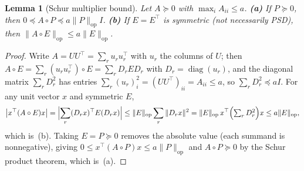 \documentclass{article}
\newtheorem{lemma}[theorem]{Lemma}
\begin{document}
\begin{lemma}[Schur multiplier bound]\label{lem:schur}
Let $A\succeq0$ with $\max_i A_{ii}\le a$. \textbf{(a)} If $P\succeq0$, then $0\preceq A\circ P\preceq a\|P\|_{\mathrm{op}}I$. \textbf{(b)} If $E=E^\top$ is symmetric (not necessarily PSD), then $\|A\circ E\|_{\mathrm{op}}\le a\|E\|_{\mathrm{op}}$.
\end{lemma}
\begin{proof}
Write $A=UU^\top=\sum_r u_r u_r^\top$ with $u_r$ the columns of $U$; then $A\circ E=\sum_r(u_r u_r^\top)\circ E=\sum_r D_r E D_r$ with $D_r=\operatorname{diag}(u_r)$, and the diagonal matrix $\sum_r D_r^2$ has entries $\sum_r(u_r)_i^2=(UU^\top)_{ii}=A_{ii}\le a$, so $\sum_r D_r^2\preceq aI$. For any unit vector $x$ and symmetric $E$,
\[
\bigl|x^\top(A\circ E)x\bigr|=\Bigl|\sum_r(D_r x)^\top E(D_r x)\Bigr|\le\|E\|_{\mathrm{op}}\sum_r\|D_r x\|^2=\|E\|_{\mathrm{op}}\,x^\top\Bigl(\textstyle\sum_r D_r^2\Bigr)x\le a\|E\|_{\mathrm{op}},
\]
which is~(b). Taking $E=P\succeq0$ removes the absolute value (each summand is nonnegative), giving $0\le x^\top(A\circ P)x\le a\|P\|_{\mathrm{op}}$ and $A\circ P\succeq0$ by the Schur product theorem, which is~(a).
\end{proof}
\end{document}
